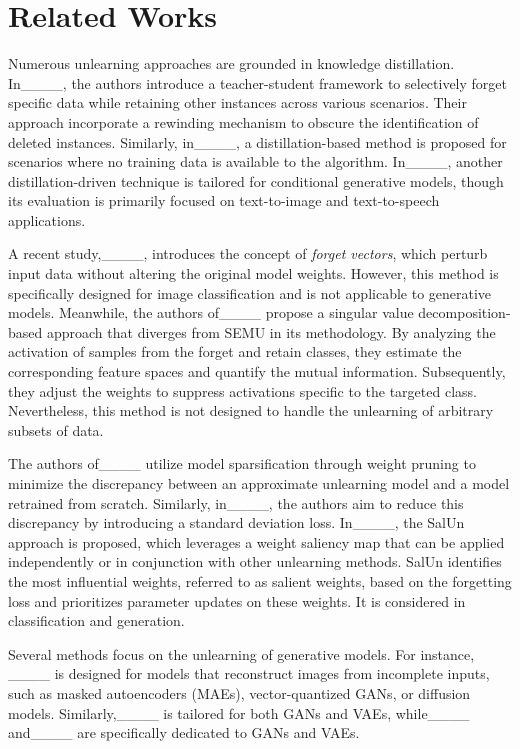 \section{Related Works}
\label{sec:rw}

Numerous unlearning approaches are grounded in knowledge distillation. In____, the authors introduce a teacher-student framework to selectively forget specific data while retaining other instances across various scenarios. Their approach incorporate a rewinding mechanism to obscure the identification of deleted instances. Similarly, in____, a distillation-based method is proposed for scenarios where no training data is available to the algorithm. In____, another distillation-driven technique is tailored for conditional generative models, though its evaluation is primarily focused on text-to-image and text-to-speech applications.

A recent study,____, introduces the concept of \emph{forget vectors}, which perturb input data without altering the original model weights. However, this method is specifically designed for image classification and is not applicable to generative models. Meanwhile, the authors of____ propose a 
singular value decomposition-based approach that diverges from SEMU in its methodology.
By analyzing the activation of samples from the forget and retain classes, they estimate the corresponding feature spaces and quantify the mutual information. Subsequently, they adjust the weights to suppress activations specific to the targeted class. Nevertheless, this method is not designed to handle the unlearning of arbitrary subsets of data.

The authors of____ utilize model sparsification through weight pruning to minimize the discrepancy between an approximate unlearning model and a model retrained from scratch. Similarly, in____, the authors aim to reduce this discrepancy by introducing a standard deviation loss.
In____, the SalUn approach is proposed, which leverages a weight saliency map that can be applied independently or in conjunction with other unlearning methods. SalUn identifies the most influential weights, referred to as salient weights, based on  the forgetting loss  and prioritizes parameter updates on these weights.
It is considered in classification and generation.

Several methods focus on the unlearning of generative models. For instance, ____ is designed for models that reconstruct images from incomplete inputs, such as masked autoencoders (MAEs), vector-quantized GANs, or diffusion models. Similarly,____ is tailored for both GANs and VAEs, while____ and____ are specifically dedicated to GANs and VAEs. 

